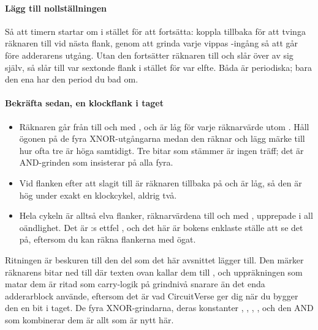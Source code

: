 \paragraph{Lägg till nollställningen}
Så att timern startar om i stället för att fortsätta: koppla tillbaka  för att tvinga
räknaren till  vid nästa flank, genom att grinda varje vippas -ingång så att
 går före adderarens utgång. Utan den fortsätter räknaren till  och
slår över av sig själv, så  slår till var sextonde flank i stället för var elfte. Båda
är periodiska; bara den ena har den period du bad om.

\paragraph{Bekräfta sedan, en klockflank i taget}
\begin{itemize}
  \item Räknaren går från  till och med , och  är låg för varje
    räknarvärde utom . Håll ögonen på de fyra XNOR-utgångarna medan den räknar och lägg
    märke till hur ofta tre är höga samtidigt. Tre bitar som stämmer är ingen träff; det är
    AND-grinden som insisterar på alla fyra.
  \item Vid flanken efter att  slagit till är räknaren tillbaka på  och
     är låg, så den är hög under exakt en klockcykel, aldrig två.
  \item Hela cykeln är alltså elva flanker, räknarvärdena  till och med , upprepade
    i all oändlighet. Det är :s ettfel , och det här är
    bokens enklaste ställe att se det på, eftersom du kan räkna flankerna med ögat.
\end{itemize}


Ritningen är beskuren till den del som det här avsnittet lägger till. Den märker räknarens bitar
 ned till  där texten ovan kallar dem  till ,
och uppräkningen som matar dem är ritad som carry-logik på grindnivå snarare än det enda
adderarblock  använde, eftersom det är vad CircuitVerse ger dig när du bygger
den en bit i taget. De fyra XNOR-grindarna, deras konstanter , , ,
, och den AND som kombinerar dem är allt som är nytt här.

